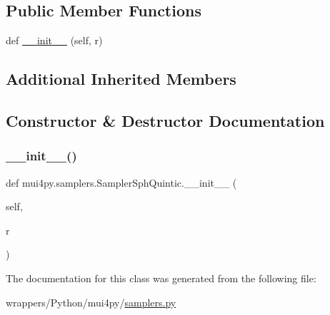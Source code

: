\subsection*{Public Member Functions}
\begin{DoxyCompactItemize}
\item 
def \hyperlink{classmui4py_1_1samplers_1_1_sampler_sph_quintic_a02b9b654ec27b4a2e5e80418fa678378}{\+\_\+\+\_\+init\+\_\+\+\_\+} (self, r)
\end{DoxyCompactItemize}
\subsection*{Additional Inherited Members}


\subsection{Constructor \& Destructor Documentation}
\mbox{\label{classmui4py_1_1samplers_1_1_sampler_sph_quintic_a02b9b654ec27b4a2e5e80418fa678378}} 
\subsubsection{\texorpdfstring{\+\_\+\+\_\+init\+\_\+\+\_\+()}{\_\_init\_\_()}}
{\footnotesize\ttfamily def mui4py.\+samplers.\+Sampler\+Sph\+Quintic.\+\_\+\+\_\+init\+\_\+\+\_\+ (\begin{DoxyParamCaption}\item[{}]{self,  }\item[{}]{r }\end{DoxyParamCaption})}



The documentation for this class was generated from the following file\+:\begin{DoxyCompactItemize}
\item 
wrappers/\+Python/mui4py/\hyperlink{samplers_8py}{samplers.\+py}\end{DoxyCompactItemize}
